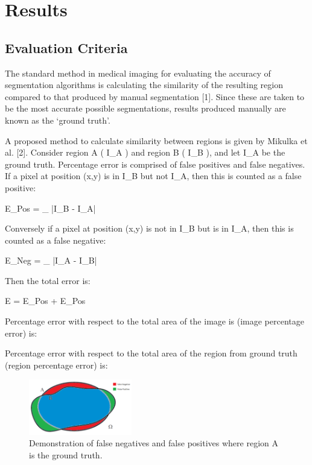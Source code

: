 \documentclass{article}
\begin{document}
	\section{Results}
		\subsection{Evaluation Criteria}
		The standard method in medical imaging for evaluating the accuracy of segmentation algorithms is calculating the similarity of the resulting region compared to that produced by manual segmentation [1]. Since these are taken to be the most accurate possible segmentations, results produced manually are known as the ‘ground truth’.

		A proposed method to calculate similarity between regions is given by Mikulka et al. [2]. Consider region A ( I_{A} ) and region B ( I_{B} ), and let I_{A} be the ground truth. Percentage error is comprised of false positives and false negatives. If a pixel at position (x,y) is in I_{B} but not I_{A}, then this is counted as a false positive:
		
		\begin{center} E_{Pos} = \sum_{\Omega } |I_{B} - I_{A}| \end{center}
		
		Conversely if a pixel at position (x,y) is not in I_{B} but is in I_{A}, then this is counted as a false negative:   
		
		\begin{center} E_{Neg} = \sum_{\Omega } |I_{A} - I_{B}| \end{center}
		
		Then the total error is:
		
		\begin{center} E = E_{Pos} + E_{Pos} \end{center}
		
		Percentage error with respect to the total area of the image is (image percentage error) is:
		
		\begin{center}  \end{center}
		
		Percentage error with respect to the total area of the region from ground truth (region percentage error) is:
		
		\begin{center}  \end{center}

		\begin{figure}[H]
		\centering
		\includegraphics[width=0.4\textwidth]{Mandy/FalsePosFalseNeg.png}
		\caption{Demonstration of false negatives and false positives where region A is the ground truth.}
		\label{fig:falsePosFalseNeg}
		\end{figure}
\end{document}
